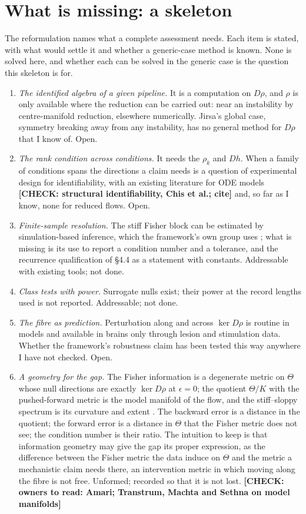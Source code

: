 \documentclass[10pt]{article}
\newcommand{\CHECK}[1]{\textcolor{purple!70!black}{\textbf{[CHECK: #1]}}}
\begin{document}
\section{What is missing: a skeleton}
The reformulation names what a complete assessment needs. Each item is stated, with what would settle it and whether a generic-case method is known. None is solved here, and whether each can be solved in the generic case is the question this skeleton is for.
\begin{enumerate}[label=O\arabic*.,leftmargin=2.6em]
\item \emph{The identified algebra of a given pipeline.} It is a computation on $D\rho$, and $\rho$ is only available where the reduction can be carried out: near an instability by centre-manifold reduction, elsewhere numerically. Jirsa's global case, symmetry breaking away from any instability, has no general method for $D\rho$ that I know of. Open.
\item \emph{The rank condition across conditions.} It needs the $\rho_k$ and $Dh$. When a family of conditions spans the directions a claim needs is a question of experimental design for identifiability, with an existing literature for ODE models \CHECK{structural identifiability, Chis et al.; cite} and, so far as I know, none for reduced flows. Open.
\item \emph{Finite-sample resolution.} The stiff Fisher block can be estimated by simulation-based inference, which the framework's own group uses \parencite{hashemi2024}; what is missing is its use to report a condition number and a tolerance, and the recurrence qualification of \S4.4 as a statement with constants. Addressable with existing tools; not done.
\item \emph{Class tests with power.} Surrogate nulls exist; their power at the record lengths used is not reported. Addressable; not done.
\item \emph{The fibre as prediction.} Perturbation along and across $\ker D\rho$ is routine in models and available in brains only through lesion and stimulation data. Whether the framework's robustness claim has been tested this way anywhere I have not checked. Open.
\item \emph{A geometry for the gap.} The Fisher information is a degenerate metric on $\Theta$ whose null directions are exactly $\ker D\rho$ at $\epsilon=0$; the quotient $\Theta/K$ with the pushed-forward metric is the model manifold of the flow, and the stiff--sloppy spectrum is its curvature and extent \parencite{machta2013}. The backward error is a distance in the quotient; the forward error is a distance in $\Theta$ that the Fisher metric does not see; the condition number is their ratio. The intuition to keep is that information geometry may give the gap its proper expression, as the difference between the Fisher metric the data induce on $\Theta$ and the metric a mechanistic claim needs there, an intervention metric in which moving along the fibre is not free. Unformed; recorded so that it is not lost. \CHECK{owners to read: Amari; Transtrum, Machta and Sethna on model manifolds}
\end{enumerate}
\end{document}
